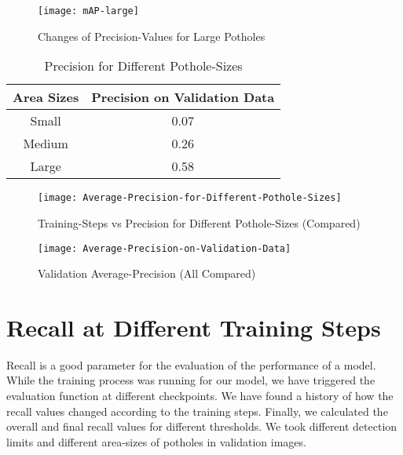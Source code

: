             \begin{figure}
                \centering
                \texttt{[image: mAP-large]}
                \caption{Changes of Precision-Values for Large Potholes}
                \label{fig:precision_sizes_large}
            \end{figure}
            
            \begin{table}
                \centering
                \begin{tabular}{|c||c|} \hline 
                     Area Sizes  &  Precision on Validation Data \\\hline\hline
                     Small  &  0.07 \\\hline
                     Medium  &  0.26 \\\hline
                     Large  &  0.58 \\\hline
                \end{tabular}
                \caption{Precision for Different Pothole-Sizes}
                \label{tab:precision_sizes}
            \end{table}
            
            \clearpage
            \begin{figure}
                \centering
                \texttt{[image: Average-Precision-for-Different-Pothole-Sizes]}
                \caption{Training-Steps vs Precision for Different Pothole-Sizes (Compared)}
                \label{fig:precision_sizes}
            \end{figure}
            
            \begin{figure}
                \centering
                \texttt{[image: Average-Precision-on-Validation-Data]}
                \caption{Validation Average-Precision (All Compared)}
                \label{fig:precisions}
            \end{figure}
            
    \clearpage
    \section{Recall at Different Training Steps}
        Recall is a good parameter for the evaluation of the performance of a model. While the training process was running for our model, we have triggered the evaluation function at different checkpoints. We have found a history of how the recall values changed according to the training steps. Finally, we calculated the overall and final recall values for different thresholds. We took different detection limits and different area-sizes of potholes in validation images.
        
